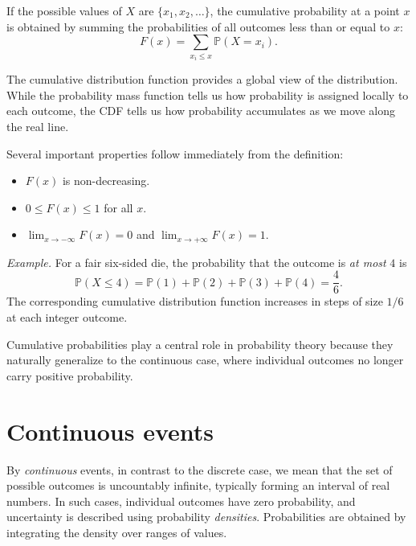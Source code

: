 \medskip

If the possible values of $X$ are $\{x_1, x_2, \dots\}$, the cumulative probability at a point $x$ is obtained by summing the probabilities of all outcomes less than or equal to $x$:
\begin{equation}
    F(x) = \sum_{x_i \le x} \mathbb{P}(X = x_i).
\end{equation}

The cumulative distribution function provides a global view of the distribution. While the probability mass function tells us how probability is assigned locally to each outcome, the CDF tells us how probability accumulates as we move along the real line.

\medskip

Several important properties follow immediately from the definition:
\begin{itemize}
    \item $F(x)$ is non-decreasing.
    \item $0 \le F(x) \le 1$ for all $x$.
    \item $\lim_{x \to -\infty} F(x) = 0$ and $\lim_{x \to +\infty} F(x) = 1$.
\end{itemize}

\medskip

\textit{Example.} For a fair six-sided die, the probability that the outcome is \textit{at most} $4$ is
\[
    \mathbb{P}(X \le 4) = \mathbb{P}(1) + \mathbb{P}(2) + \mathbb{P}(3) + \mathbb{P}(4) = \frac{4}{6}.
\]
The corresponding cumulative distribution function increases in steps of size $1/6$ at each integer outcome.

\medskip

Cumulative probabilities play a central role in probability theory because they naturally generalize to the continuous case, where individual outcomes no longer carry positive probability.


\medskip

\section{Continuous events}

By \textit{continuous} events, in contrast to the discrete case, we mean that the set of possible outcomes is uncountably infinite, typically forming an interval of real numbers. In such cases, individual outcomes have zero probability, and uncertainty is described using probability \textit{densities}. Probabilities are obtained by integrating the density over ranges of values.

